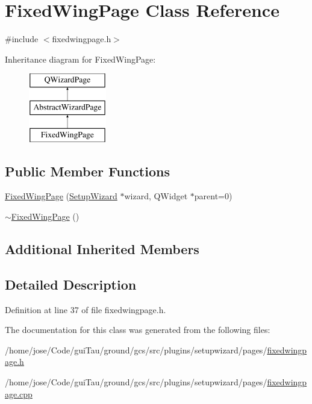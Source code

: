 \hypertarget{class_fixed_wing_page}{\section{Fixed\-Wing\-Page Class Reference}
\label{class_fixed_wing_page}
}


{\ttfamily \#include $<$fixedwingpage.\-h$>$}

Inheritance diagram for Fixed\-Wing\-Page\-:\begin{figure}[H]
\begin{center}
\leavevmode
\includegraphics[height=3.000000cm]{class_fixed_wing_page}
\end{center}
\end{figure}
\subsection*{Public Member Functions}
\begin{DoxyCompactItemize}
\item 
\hyperlink{group___fixed_wing_page_gaef301c725ba23ad6831b95d002859a1d}{Fixed\-Wing\-Page} (\hyperlink{class_setup_wizard}{Setup\-Wizard} $\ast$wizard, Q\-Widget $\ast$parent=0)
\item 
\hyperlink{group___fixed_wing_page_ga626dba2ab3598a1220f7ee4fae37ed5f}{$\sim$\-Fixed\-Wing\-Page} ()
\end{DoxyCompactItemize}
\subsection*{Additional Inherited Members}


\subsection{Detailed Description}


Definition at line 37 of file fixedwingpage.\-h.



The documentation for this class was generated from the following files\-:\begin{DoxyCompactItemize}
\item 
/home/jose/\-Code/gui\-Tau/ground/gcs/src/plugins/setupwizard/pages/\hyperlink{fixedwingpage_8h}{fixedwingpage.\-h}\item 
/home/jose/\-Code/gui\-Tau/ground/gcs/src/plugins/setupwizard/pages/\hyperlink{fixedwingpage_8cpp}{fixedwingpage.\-cpp}\end{DoxyCompactItemize}
